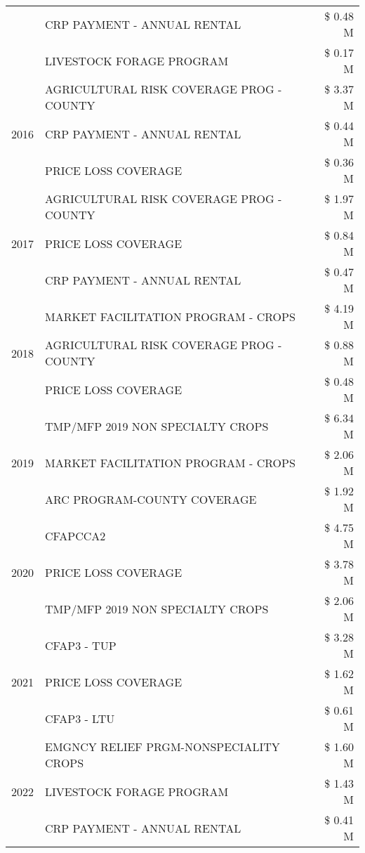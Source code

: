 \begin{tabular}{llr}
 & CRP PAYMENT - ANNUAL RENTAL & \$ 0.48 M \\
 & LIVESTOCK FORAGE PROGRAM & \$ 0.17 M \\
\cline{1-3}
\multirow[t]{3}{*}{2016} & AGRICULTURAL RISK COVERAGE PROG - COUNTY & \$ 3.37 M \\
 & CRP PAYMENT - ANNUAL RENTAL & \$ 0.44 M \\
 & PRICE LOSS COVERAGE & \$ 0.36 M \\
\cline{1-3}
\multirow[t]{3}{*}{2017} & AGRICULTURAL RISK COVERAGE PROG - COUNTY & \$ 1.97 M \\
 & PRICE LOSS COVERAGE & \$ 0.84 M \\
 & CRP PAYMENT - ANNUAL RENTAL & \$ 0.47 M \\
\cline{1-3}
\multirow[t]{3}{*}{2018} & MARKET FACILITATION PROGRAM - CROPS & \$ 4.19 M \\
 & AGRICULTURAL RISK COVERAGE PROG - COUNTY & \$ 0.88 M \\
 & PRICE LOSS COVERAGE & \$ 0.48 M \\
\cline{1-3}
\multirow[t]{3}{*}{2019} & TMP/MFP 2019 NON SPECIALTY CROPS & \$ 6.34 M \\
 & MARKET FACILITATION PROGRAM - CROPS & \$ 2.06 M \\
 & ARC PROGRAM-COUNTY COVERAGE & \$ 1.92 M \\
\cline{1-3}
\multirow[t]{3}{*}{2020} & CFAPCCA2 & \$ 4.75 M \\
 & PRICE LOSS COVERAGE & \$ 3.78 M \\
 & TMP/MFP 2019 NON SPECIALTY CROPS & \$ 2.06 M \\
\cline{1-3}
\multirow[t]{3}{*}{2021} & CFAP3 - TUP & \$ 3.28 M \\
 & PRICE LOSS COVERAGE & \$ 1.62 M \\
 & CFAP3 - LTU & \$ 0.61 M \\
\cline{1-3}
\multirow[t]{3}{*}{2022} & EMGNCY RELIEF PRGM-NONSPECIALITY CROPS & \$ 1.60 M \\
 & LIVESTOCK FORAGE PROGRAM & \$ 1.43 M \\
 & CRP PAYMENT - ANNUAL RENTAL & \$ 0.41 M \\
\cline{1-3}
\bottomrule
\end{tabular}
